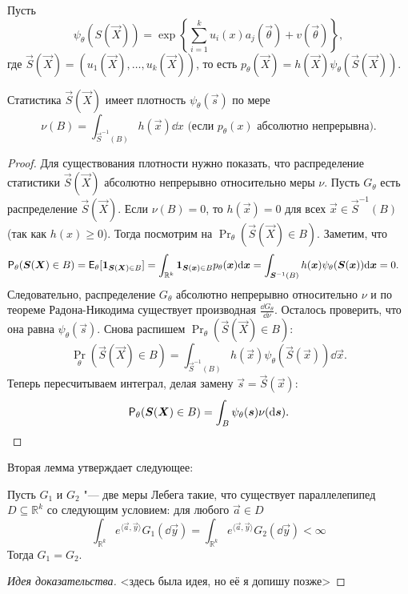 Пусть 
\[
	\psi_{\theta}(S(\vec{X})) = \exp\left\{\sum_{i = 1}^{k}u_{i}(x)a_{j}(\vec{\theta}) + v(\vec{\theta})\right\},
\]
где $\vec{S}(\vec{X}) = (u_{1}(\vec{X}), \ldots, u_{k}(\vec{X}))$, то есть $p_{\theta}(\vec{X}) = h(\vec{X})\psi_{\theta}(\vec{S}(\vec{X}))$. 
\begin{lemma}
	Статистика $\vec{S}(\vec{X})$ имеет плотность $\psi_{\theta}(\vec{s})$ по мере
	\[
		\nu(B) = \int_{\vec{S}^{-1}(B)} h(\vec{x})\dd x \text{ (если } p_{\theta}(x) \text{ абсолютно непрерывна)}.
	\]
\end{lemma}
\begin{proof}
	Для существования плотности нужно показать, что распределение статистики $\vec{S}(\vec{X})$ абсолютно непрерывно относительно меры $\nu$. Пусть $G_{\theta}$ есть распределение $\vec{S}(\vec{X})$. Если $\nu(B) = 0$, то $h(\vec{x}) = 0$ для всех $\vec{x} \in \vec{S}^{-1}(B)$ (так как $h(x) \geq 0$). Тогда посмотрим на $\Pr_{\theta}(\vec{S}(\vec{X}) \in B)$. Заметим, что
	\begin{align*}
		\mathsf{P}_{\theta}(\bm{S}(\bm{X}) \in B)
		&= \operatorname{\mathsf{E}}_{\theta}[\mathbf{1}_{\bm{S}(\bm{X}) \in B}]
		= \int_{\mathbb{R}^{k}} \mathbf{1}_{\bm{S}(\bm{x}) \in B}p_{\theta}(\bm{x})\dd \bm{x}
		= \int_{\bm{S}^{-1}(B)} h(\bm{x})\psi_{\theta}(\bm{S}(\bm{x}))\dd \bm{x}
		= 0.
	\end{align*}
	Следовательно, распределение $G_{\theta}$ абсолютно непрерывно относительно $\nu$ и по теореме Радона-Никодима существует производная $\frac{\dd G_{\theta}}{\dd \nu}$. Осталось проверить, что она равна $\psi_{\theta}(\vec{s})$. Снова распишем $\Pr_{\theta}(\vec{S}(\vec{X}) \in B)$:
	\[
		\Pr_{\theta}(\vec{S}(\vec{X}) \in B)
		= \int_{\vec{S}^{-1}(B)} h(\vec{x})\psi_{\theta}(\vec{S}(\vec{x}))\dd \vec{x}.
	\]
	Теперь пересчитываем интеграл, делая замену $\vec{s} = \vec{S}(\vec{x})$:
	\[
		\mathsf{P}_{\theta}(\bm{S}(\bm{X}) \in B)
		= \int_{B} \psi_{\theta}(\bm{s})\nu(\dd \bm{s}). \qedhere
	\]
\end{proof}

Вторая лемма утверждает следующее:
\begin{lemma}
	Пусть $G_{1}$ и $G_{2}$ "--- две меры Лебега такие, что существует параллелепипед $D \subseteq \mathbb{R}^{k}$ со следующим условием: для любого $\vec{a} \in D$
	\[
		\int_{\mathbb{R}^{k}} e^{\langle \vec{a}, \vec{y} \rangle}G_{1}(\dd \vec{y})
		= \int_{\mathbb{R}^{k}} e^{\langle \vec{a}, \vec{y} \rangle}G_{2}(\dd \vec{y})
		< \infty
	\]
	Тогда $G_{1} = G_{2}$.
\end{lemma}
\begin{proof}[Идея доказательства]
	<здесь была идея, но её я допишу позже>
\end{proof}

